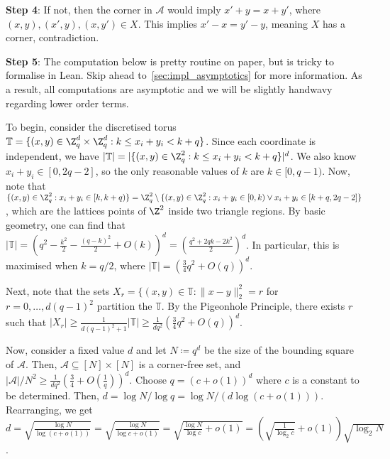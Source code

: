 \vspace{5mm}

\textbf{Step 4}: If not, then the corner in \(\mathcal{A}\) would imply \(x' + y = x + y'\), where \((x, y), (x', y), (x, y') \in X\). This implies \(x' - x = y' - y\), meaning \(X\) has a corner, contradiction.

\vspace{5mm}

\textbf{Step 5}:\label{lemma:asympt} The computation below is pretty routine on paper, but is tricky to formalise in Lean. Skip ahead to~\cref{sec:impl_asymptotics} for more information. As a result, all computations are asymptotic and we will be slightly handwavy regarding lower order terms.

To begin, consider the discretised torus \(\mathbb{T} = \{(x, y) \in \Z_q^d \times \Z_q^d : k \leq x_i + y_i < k + q\}\). Since each coordinate is independent, we have \(|\mathbb{T}| = |\{(x, y) \in \Z_q^2 : k \leq x_i + y_i < k + q\}|^d\). We also know \(x_i + y_i \in [0, 2q - 2]\), so the only reasonable values of \(k\) are \(k \in [0, q - 1)\). Now, note that \(\{(x, y) \in \Z_q^2 : x_i + y_i \in [k, k + q)\} = \Z_q^2 \setminus \{(x, y) \in \Z_q^2 : x_i + y_i \in [0, k) \lor x_i + y_i \in [k + q, 2q - 2]\}\), which are the lattices points of \(\Z^2\) inside two triangle regions. By basic geometry, one can find that \(|\mathbb{T}| = \left(q^2 - \frac{k^2}{2} - \frac{(q - k)^2}{2} + O(k)\right)^d = \left(\frac{q^2 + 2qk - 2k^2}{2}\right)^d\). In particular, this is maximised when \(k = q / 2\), where \(|\mathbb{T}| = \left(\frac{3}{4}q^2 + O(q)\right)^d\).

\vspace{5mm}

Next, note that the sets \(X_r = \{(x, y) \in \mathbb{T} : \|x - y\|_2^2 = r\) for \(r = 0, \ldots, d(q - 1)^2\) partition the \(\mathbb{T}\). By the Pigeonhole Principle, there exists \(r\) such that \(|X_r| \geq \frac{1}{d(q - 1)^2 + 1}|\mathbb{T}| \geq \frac{1}{dq^2}\left(\frac{3}{4}q^2 + O(q)\right)^d\).

Now, consider a fixed value \(d\) and let \(N \coloneqq q^d\) be the size of the bounding square of \(\mathcal{A}\). Then, \(\mathcal{A} \subseteq [N] \times [N]\) is a corner-free set, and \(|\mathcal{A}| / N^2 \geq \frac{1}{dq^2}\left(\frac{3}{4} + O\left(\frac{1}{q}\right)\right)^d\). Choose \(q = (c + o(1))^d\) where \(c\) is a constant to be determined. Then, \(d = \log N / \log q = \log N / \left(d\log(c + o(1))\right)\). Rearranging, we get \(d = \sqrt{\frac{\log N}{\log(c + o(1))}} = \sqrt{\frac{\log N}{\log c + o(1)}} = \sqrt{\frac{\log N}{\log c} + o(1)} = \left(\sqrt{\frac{1}{\log_2 c}} + o(1)\right)\sqrt{\log_2 N}\).

